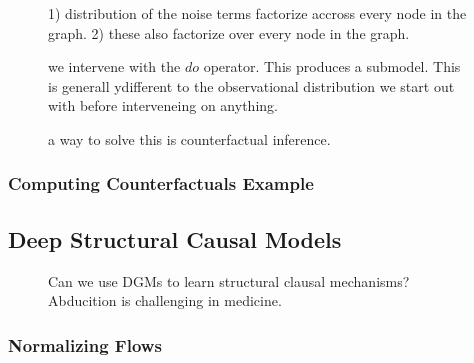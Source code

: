 \documentclass[11pt]{article}
\begin{document}
\begin{figure}[H]
    \centering
    \caption{1) distribution of the noise terms factorize accross every node in the graph. 2) these also factorize over every node in the graph.}
\end{figure}

\begin{figure}[H]
    \centering
    \caption{we intervene with the $do$ operator. This produces a submodel. This is generall ydifferent to the observational distribution we start out with before interveneing on anything.}
\end{figure}

\begin{figure}[H]
    \centering
    \caption{a way to solve this is counterfactual inference.}
\end{figure}

\subsubsection{Computing Counterfactuals Example}

\begin{figure}[H]
    \centering
\end{figure}

\subsection{Deep Structural Causal Models}

\begin{figure}[H]
    \centering
    \caption{Can we use DGMs to learn structural clausal mechanisms? Abducition is challenging in medicine.}
\end{figure}

\subsubsection{Normalizing Flows}

\begin{figure}[H]
    \centering
\end{figure}
\end{document}
